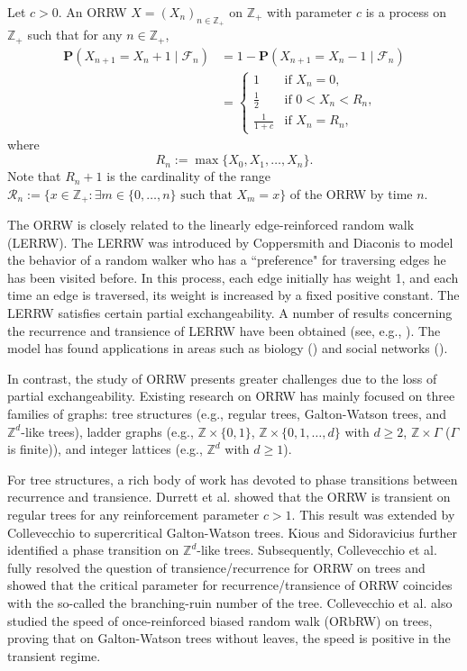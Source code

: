 \documentclass[12pt]{article}
\def \cal{\mathcal}
\numberwithin{equation}{section}
\begin{document}
Let $c>0$. An ORRW $X=(X_{n})_{n \in \mathbb{Z}_{+}}$ on $\mathbb{Z}_{+}$ with parameter $c$ is a process on $\mathbb{Z}_{+}$ such that for any $n \in \mathbb{Z}_+$,
\begin{align}
\mathbf{P}(X_{n+1} = X_{n} + 1 \mid \mathcal{F}_{n}) &= 1 - \mathbf{P}(X_{n+1} = X_{n} - 1 \mid \mathcal{F}_{n}) \nonumber \\
&=\left\{
\begin{array}{cl}
1 & \text{if } X_n = 0, \\
\frac{1}{2} & \text{if } 0 < X_{n} < R_{n}, \\
\frac{1}{1+c}& \text{if } X_{n} = R_{n},
\end{array}
\right.
\end{align}
where
\begin{equation}\label{2.2}
R_{n}:= \max\{X_{0},X_{1},\ldots, X_{n}\}.
\end{equation}
Note that $R_n+1$ is the cardinality of the range ${\cal R}_n:=\{x\in \mathbb{Z}_+: \exists m\in \{0, \dots, n\} \mbox{ such that } X_m=x\}$ of the ORRW by time $n$.

The  ORRW is closely related to
the linearly edge-reinforced random walk (LERRW). The LERRW
was introduced by Coppersmith and Diaconis \cite{CD} to model the behavior of a random walker who has a ``preference" for traversing edges he has been visited before. In this  process,  each edge initially has weight 1, and each time an edge is traversed, its weight is increased by a fixed positive constant.
The LERRW
satisfies certain partial exchangeability.
A number of results concerning the recurrence and transience of
LERRW
have been obtained (see, e.g., \cite{AO, DM, SC, SC2}). The model has  found applications in areas such as  biology (\cite{SA}) and social networks (\cite{PR}).

In contrast, the study of ORRW presents greater  challenges  due to the loss of partial
exchangeability.
Existing research on ORRW  has mainly focused on three families of graphs: tree structures (e.g., regular trees, Galton-Watson trees, and $\mathbb{Z}^{d}$-like trees),  ladder graphs (e.g., $\mathbb{Z}\times \{0,1\}$, $\mathbb{Z}\times \{0,1, \ldots, d\}$ with $d \geq 2$, $ \mathbb{Z}\times \Gamma$ ($\Gamma$ is  finite)), and integer lattices (e.g., $\mathbb{Z}^{d}$ with $d \geq 1$).

For tree structures, a rich body of work has devoted to phase transitions between  recurrence and transience. Durrett et al. \cite{DR} showed that  the ORRW is transient on regular trees for any reinforcement parameter $c>1$.  This result was extended by  Collevecchio \cite{CA1}   to supercritical Galton-Watson trees. Kious and Sidoravicius \cite{KD} further identified a phase transition on $\mathbb{Z}^{d}$-like trees. Subsequently, Collevecchio et al. \cite{CA2} fully resolved the question of transience/recurrence for ORRW on trees and showed that the critical parameter for  recurrence/transience of ORRW coincides with the so-called the branching-ruin number of the tree.
Collevecchio et al. \cite{CA3} also studied the speed of once-reinforced biased random walk (ORbRW) on trees, proving that on Galton-Watson trees without leaves, the speed is positive in the transient regime.
\end{document}
